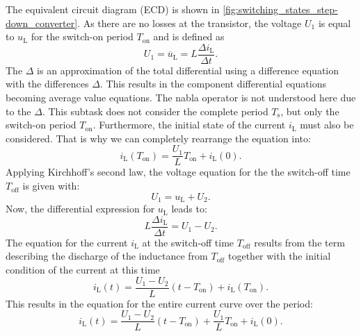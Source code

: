 \begin{solutionblock}
    
    The equivalent circuit diagram (ECD) is shown in \autoref{fig:switching_states_step-down_converter}.
    As there are no losses at the transistor, the voltage $U_{\mathrm{1}}$ is equal to $u_{\mathrm{L}}$ for the switch-on period $T_{\mathrm{on}}$ and is defined as
    \begin{equation}
        U_{\mathrm{1}} = \overline u_{\mathrm{L}} = L \frac{\Delta i_{\mathrm{L}} }{\Delta t}. 
    \end{equation} 
    The $\Delta$ is an approximation of the total differential using a difference equation with the differences $\Delta$. This results in the component differential equations becoming average value equations. The nabla operator is not understood here due to the $\Delta$.
    This subtask does not consider the complete period $T_{\mathrm{s}}$, but only the switch-on period $T_{\mathrm{on}}$. Furthermore, the initial state of the current $i_{\mathrm{L}}$ must also be considered.
    That is why we can completely rearrange the equation into:
    \begin{equation}
        i_{\mathrm{L}}(T_{\mathrm{on}}) =  \frac{U_{\mathrm{1}} }{L}T_{\mathrm{on}} +  i_{\mathrm{L}}(0).
    \end{equation}
    Applying Kirchhoff's second law, the voltage equation for the  the switch-off time $T_{\mathrm{off}}$ is given with:
    \begin{equation}
        U_{\mathrm{1}} = u_{\mathrm{L}} + U_{\mathrm{2}}.
    \end{equation}
    Now, the differential expression for $u_{\mathrm{L}}$ leads to:
    \begin{equation}
        L \frac{\Delta i_{\mathrm{L}} }{\Delta t} = U_{\mathrm{1}} - U_{\mathrm{2}}.
    \end{equation}
    The equation for the current $i_{\mathrm{L}}$ at the switch-off time $T_{\mathrm{off}}$ results from the term describing the discharge of the inductance from $T_{\mathrm{off}}$ together with the initial condition of the current at this time
    \begin{equation}
        i_{\mathrm{L}}(t) = \frac{U_{\mathrm{1}}-U_{\mathrm{2}} }{L} (t-T_{\mathrm{on}})+i_{\mathrm{L}}(T_{\mathrm{on}}).
    \end{equation}
    This results in the equation for the entire current curve over the period: 
    \begin{equation}
        i_{\mathrm{L}}(t) = \frac{U_{\mathrm{1}}-U_{\mathrm{2}} }{L} (t-T_{\mathrm{on}})+\frac{U_{\mathrm{1}}}{L}T_{\mathrm{on}}+i_{\mathrm{L}}(0).

\end{equation}
\end{solutionblock}
